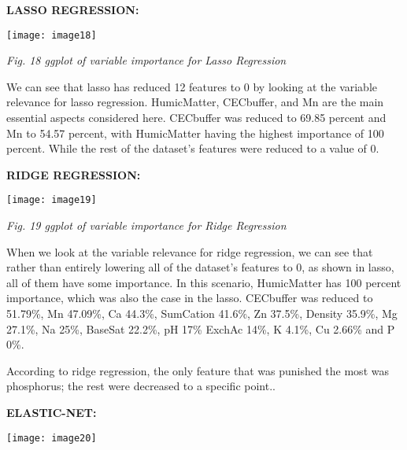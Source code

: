 \documentclass{article} %
\begin{document}
\noindent \textbf{}

\noindent \textbf{}

\noindent \textbf{}

\noindent \textbf{}

\noindent \textbf{}

\noindent \textbf{}

\noindent \textbf{}

\noindent \textbf{}

\noindent \textbf{}

\noindent \textbf{LASSO REGRESSION:}

\noindent \texttt{[image: image18]}

\noindent \textit{Fig. 18 ggplot of variable importance for Lasso Regression}

\noindent We can see that lasso has reduced 12 features to 0 by looking at the variable relevance for lasso regression. HumicMatter, CECbuffer, and Mn are the main essential aspects considered here. CECbuffer was reduced to 69.85 percent and Mn to 54.57 percent, with HumicMatter having the highest importance of 100 percent. While the rest of the dataset's features were reduced to a value of 0.

\noindent \textbf{RIDGE REGRESSION:}

\noindent \texttt{[image: image19]}\textbf{}

\noindent \textit{Fig. 19 ggplot of variable importance for Ridge Regression}

\noindent 

\noindent When we look at the variable relevance for ridge regression, we can see that rather than entirely lowering all of the dataset's features to 0, as shown in lasso, all of them have some importance. In this scenario, HumicMatter has 100 percent importance, which was also the case in the lasso. CECbuffer was reduced to 51.79\%, Mn 47.09\%, Ca 44.3\%, SumCation 41.6\%, Zn 37.5\%, Density 35.9\%, Mg 27.1\%, Na 25\%, BaseSat 22.2\%, pH 17\% ExchAc 14\%, K 4.1\%, Cu 2.66\% and P 0\%.

\noindent According to ridge regression, the only feature that was punished the most was phosphorus; the rest were decreased to a specific point..

\noindent \textbf{ELASTIC-NET:}

\noindent \texttt{[image: image20]}\textbf{}
\end{document}
